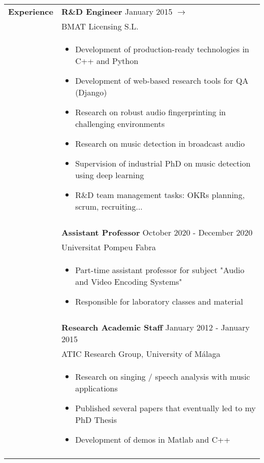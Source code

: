 \documentclass[letterpaper,11pt,oneside]{article}
\begin{document}
\small
\noindent \begin{tabularx}{\linewidth}{l X}
 \Large{\textbf{Experience}}    & \textbf{R\&D Engineer} \hfill January 2015 $\rightarrow$\\
     & BMAT Licensing S.L.\\
     & \vspace{-0.1cm}\begin{itemize}[nosep,noitemsep,topsep=0pt,partopsep=0pt]
         \item Development of production-ready technologies in C++ and Python
         \item Development of web-based research tools for QA (Django) 
         \item Research on robust audio fingerprinting in challenging environments
         \item Research on music detection in broadcast audio
         \item Supervision of industrial PhD on music detection using deep learning
         \item R\&D team management tasks: OKRs planning, scrum, recruiting...
     \end{itemize}\\
     & \\
     & \textbf{Assistant Professor} \hfill October 2020 - December 2020\\
     & Universitat Pompeu Fabra\\
     & \vspace{-0.1cm}\begin{itemize}[nosep,noitemsep,topsep=0pt,partopsep=0pt]
         \item Part-time assistant professor for subject "Audio and Video Encoding Systems"
         \item Responsible for laboratory classes and material
     \end{itemize}\\
     & \\
     & \textbf{Research Academic Staff} \hfill January 2012 - January 2015\\
     & ATIC Research Group, University of Málaga\\
     & \vspace{-0.1cm}\begin{itemize}[nosep,noitemsep,topsep=0pt,partopsep=0pt]
         \item Research on singing / speech analysis with music applications
         \item Published several papers that eventually led to my PhD Thesis
         \item Development of demos in Matlab and C++
     \end{itemize}\\
     \\
\end{tabularx}
\end{document}
